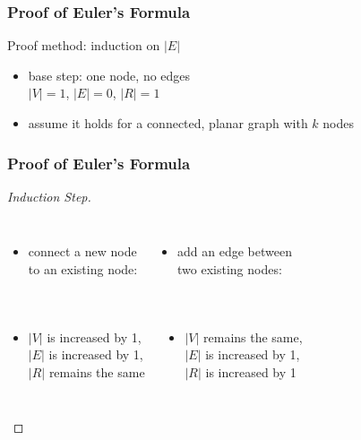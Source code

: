 \documentclass[dvipsnames]{beamer}
\begin{document}
\begin{frame}
  \frametitle{Proof of Euler's Formula}

  \begin{block}{Proof}
    method: induction on $|E|$

    \pause
    \begin{itemize}
      \item base step: one node, no edges\\
        $|V| = 1$, $|E| = 0$, $|R| = 1$

      \pause
      \item assume it holds for a connected, planar graph with $k$ nodes
    \end{itemize}
  \end{block}
\end{frame}

\begin{frame}
  \frametitle{Proof of Euler's Formula}

  \begin{proof}[Induction Step]
    \begin{columns}[t]
      \begin{itemize}
        \item connect a new node\\
	  to an existing node:

        \medskip
      \end{itemize}

      \begin{itemize}
        \item add an edge between\\
	  two existing nodes:

        \medskip
      \end{itemize}
    \end{columns}

    \pause
    \begin{columns}
      \begin{itemize}
        \item $|V|$ is increased by 1,\\
	  $|E|$ is increased by 1,\\
          $|R|$ remains the same
      \end{itemize}

      \pause
      \begin{itemize}
        \item $|V|$ remains the same,\\
	  $|E|$ is increased by 1,\\
          $|R|$ is increased by 1
      \end{itemize}
    \end{columns}
  \end{proof}
\end{frame}
\end{document}
